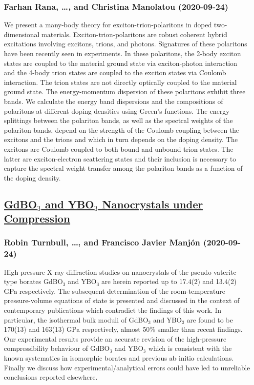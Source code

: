 \subsubsection*{Farhan Rana, \dots, and Christina Manolatou (2020-09-24)}
We present a many-body theory for exciton-trion-polaritons in doped
two-dimensional materials. Exciton-trion-polaritons are robust coherent hybrid
excitations involving excitons, trions, and photons. Signatures of these
polaritons have been recently seen in experiments. In these polaritons, the
2-body exciton states are coupled to the material ground state via
exciton-photon interaction and the 4-body trion states are coupled to the
exciton states via Coulomb interaction. The trion states are not directly
optically coupled to the material ground state. The energy-momentum dispersion
of these polaritons exhibit three bands. We calculate the energy band
dispersions and the compositions of polaritons at different doping densities
using Green's functions. The energy splittings between the polariton bands, as
well as the spectral weights of the polariton bands, depend on the strength of
the Coulomb coupling between the excitons and the trions and which in turn
depends on the doping density. The excitons are Coulomb coupled to both bound
and unbound trion states. The latter are exciton-electron scattering states and
their inclusion is necessary to capture the spectral weight transfer among the
polariton bands as a function of the doping density.

\subsection*{\href{http://arxiv.org/abs/2009.11944v1}{GdBO$_3$ and YBO$_3$ Nanocrystals under Compression}}
\subsubsection*{Robin Turnbull, \dots, and Francisco Javier Manjón (2020-09-24)}
High-pressure X-ray diffraction studies on nanocrystals of the
pseudo-vaterite-type borates GdBO$_3$ and YBO$_3$ are herein reported up to
17.4(2) and 13.4(2) GPa respectively. The subsequent determination of the
room-temperature pressure-volume equations of state is presented and discussed
in the context of contemporary publications which contradict the findings of
this work. In particular, the isothermal bulk moduli of GdBO$_3$ and YBO$_3$
are found to be 170(13) and 163(13) GPa respectively, almost 50\% smaller than
recent findings. Our experimental results provide an accurate revision of the
high-pressure compressibility behaviour of GdBO$_3$ and YBO$_3$ which is
consistent with the known systematics in isomorphic borates and previous ab
initio calculations. Finally we discuss how experimental/analytical errors
could have led to unreliable conclusions reported elsewhere.

